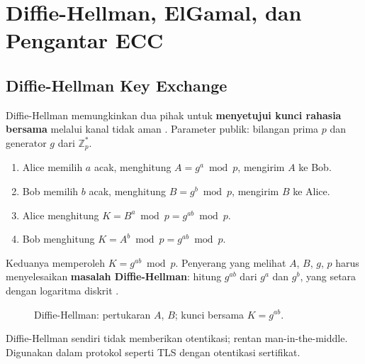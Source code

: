 ﻿\section{Diffie-Hellman, ElGamal, dan Pengantar ECC}

\subsection{Diffie-Hellman Key Exchange}

Diffie-Hellman memungkinkan dua pihak untuk \textbf{menyetujui kunci rahasia bersama} melalui kanal tidak aman \cite{stallings2017}. Parameter publik: bilangan prima $p$ dan generator $g$ dari $\mathbb{Z}_p^*$.

\begin{enumerate}
  \item Alice memilih $a$ acak, menghitung $A = g^a \bmod p$, mengirim $A$ ke Bob.
  \item Bob memilih $b$ acak, menghitung $B = g^b \bmod p$, mengirim $B$ ke Alice.
  \item Alice menghitung $K = B^a \bmod p = g^{ab} \bmod p$.
  \item Bob menghitung $K = A^b \bmod p = g^{ab} \bmod p$.
\end{enumerate}

Keduanya memperoleh $K = g^{ab} \bmod p$. Penyerang yang melihat $A$, $B$, $g$, $p$ harus menyelesaikan \textbf{masalah Diffie-Hellman}: hitung $g^{ab}$ dari $g^a$ dan $g^b$, yang setara dengan logaritma diskrit \cite{menezes1996}.

\begin{figure}[htbp]
  \centering
  \caption{Diffie-Hellman: pertukaran $A$, $B$; kunci bersama $K=g^{ab}$.}
\end{figure}

\begin{catatan}
Diffie-Hellman sendiri tidak memberikan otentikasi; rentan man-in-the-middle. Digunakan dalam protokol seperti TLS dengan otentikasi sertifikat.
\end{catatan}

